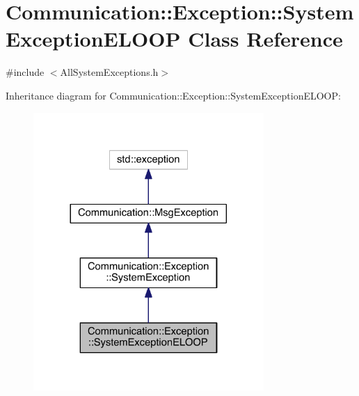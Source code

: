 \hypertarget{class_communication_1_1_exception_1_1_system_exception_e_l_o_o_p}{}\section{Communication\+:\+:Exception\+:\+:System\+Exception\+E\+L\+O\+O\+P Class Reference}
\label{class_communication_1_1_exception_1_1_system_exception_e_l_o_o_p}


{\ttfamily \#include $<$All\+System\+Exceptions.\+h$>$}



Inheritance diagram for Communication\+:\+:Exception\+:\+:System\+Exception\+E\+L\+O\+O\+P\+:\nopagebreak
\begin{figure}[H]
\begin{center}
\leavevmode
\includegraphics[width=248pt]{class_communication_1_1_exception_1_1_system_exception_e_l_o_o_p__inherit__graph}
\end{center}
\end{figure}


